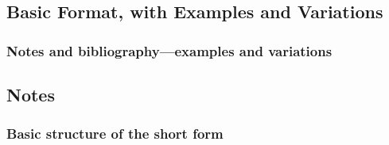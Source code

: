 \documentclass[11pt,letterpaper,oneside]{article}
\begin{document}
\subsection{Basic Format, with Examples and Variations}
\setcounter{subsection}{14}

\setcounter{subsubsection}{22}
\subsubsection{Notes and bibliography—examples and variations}
\label{14.23}

\begin{citebib}
\item \cite[87-88]{strayed2012}
\item \cite[261, 265]{strayed2012}
\item \cite[32]{daum2015}
\item \cite[134--35]{daum2015}
\item \cite[188]{grazer2015}
\item \cite[190]{grazer2015}
\item \cite[242--55]{garcia1988}
\item \cite[33]{garcia1988}
\item \cite[310]{gould1984a}
\item \cite[309]{gould1984a}
\item \cite[484--85]{bagley2015}
\item \cite[501]{bagley2015}
\item \cite[311]{liu2015}
\item \cite[312]{liu2015}
\end{citebib}

\setcounter{subsection}{1}
\subsection{Notes}
\setcounter{subsection}{14}

\setcounter{subsubsection}{29}
\subsubsection{Basic structure of the short form}
\label{14.30}

\begin{citebib}
\item \cite[24--25]{morley1995}
\item \cite{schwartz1992}
\item \cite{kaiser1964}
\item \cite[43]{morley1995}
\item \cite[138]{schwartz1992}
\item \cite[189--90]{kaiser1964}
\end{citebib}
\end{document}
